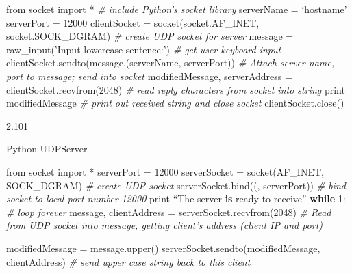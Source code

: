 \documentclass[
]{article}
\newenvironment{Shaded}{}{}
\newcommand{\BuiltInTok}[1]{#1}
\newcommand{\CommentTok}[1]{\textcolor[rgb]{0.38,0.63,0.69}{\textit{#1}}}
\newcommand{\ControlFlowTok}[1]{\textcolor[rgb]{0.00,0.44,0.13}{\textbf{#1}}}
\newcommand{\DecValTok}[1]{\textcolor[rgb]{0.25,0.63,0.44}{#1}}
\newcommand{\ImportTok}[1]{#1}
\newcommand{\KeywordTok}[1]{\textcolor[rgb]{0.00,0.44,0.13}{\textbf{#1}}}
\newcommand{\NormalTok}[1]{#1}
\newcommand{\OperatorTok}[1]{\textcolor[rgb]{0.40,0.40,0.40}{#1}}
\newcommand{\StringTok}[1]{\textcolor[rgb]{0.25,0.44,0.63}{#1}}
\begin{document}
\begin{Shaded}
\begin{Highlighting}[]
\ImportTok{from}\NormalTok{ socket }\ImportTok{import} \OperatorTok{*}   
\CommentTok{\# include Python’s socket library}
\NormalTok{serverName }\OperatorTok{=}\NormalTok{ ‘hostname’}
\NormalTok{serverPort }\OperatorTok{=} \DecValTok{12000}
\NormalTok{clientSocket }\OperatorTok{=}\NormalTok{ socket(socket.AF\_INET, socket.SOCK\_DGRAM) }
\CommentTok{\# create UDP socket for server}
\NormalTok{message }\OperatorTok{=} \BuiltInTok{raw\_input}\NormalTok{(’Input lowercase sentence:’) }
\CommentTok{\# get user keyboard input }
\NormalTok{clientSocket.sendto(message,(serverName, serverPort)) }
\CommentTok{\# Attach server name, port to message; send into socket}
\NormalTok{modifiedMessage, serverAddress }\OperatorTok{=}\NormalTok{ clientSocket.recvfrom(}\DecValTok{2048}\NormalTok{) }
\CommentTok{\# read reply characters from socket into string}
\BuiltInTok{print}\NormalTok{ modifiedMessage }
\CommentTok{\# print out received string and close socket}
\NormalTok{clientSocket.close()}
\end{Highlighting}
\end{Shaded}

2.101

Python UDPServer

\begin{Shaded}
\begin{Highlighting}[]
\ImportTok{from}\NormalTok{ socket }\ImportTok{import} \OperatorTok{*}
\NormalTok{serverPort }\OperatorTok{=} \DecValTok{12000}
\NormalTok{serverSocket }\OperatorTok{=}\NormalTok{ socket(AF\_INET, SOCK\_DGRAM)}
\CommentTok{\# create UDP socket}
\NormalTok{serverSocket.bind((}\StringTok{\textquotesingle{}\textquotesingle{}}\NormalTok{, serverPort))}
\CommentTok{\# bind socket to local port number 12000}
\BuiltInTok{print}\NormalTok{ “The server }\KeywordTok{is}\NormalTok{ ready to receive”}
\ControlFlowTok{while} \DecValTok{1}\NormalTok{:}
\CommentTok{\# loop forever}
\NormalTok{    message, clientAddress }\OperatorTok{=}\NormalTok{ serverSocket.recvfrom(}\DecValTok{2048}\NormalTok{)}
    \CommentTok{\# Read from UDP socket into message, getting client’s address (client IP and port)}
    
\NormalTok{    modifiedMessage }\OperatorTok{=}\NormalTok{ message.upper()}
\NormalTok{    serverSocket.sendto(modifiedMessage, clientAddress)}
    \CommentTok{\# send upper case string back to this client}
\end{Highlighting}
\end{Shaded}
\end{document}
